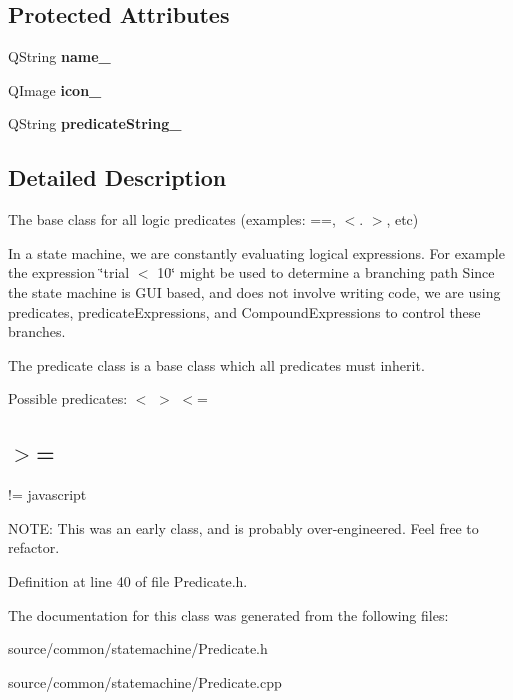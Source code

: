 \subsection*{Protected Attributes}
\begin{DoxyCompactItemize}
\item 
\hypertarget{class_picto_1_1_predicate_aa887b9849f3905bd94d6994c50ffce99}{Q\-String {\bfseries name\-\_\-}}\label{class_picto_1_1_predicate_aa887b9849f3905bd94d6994c50ffce99}

\item 
\hypertarget{class_picto_1_1_predicate_a6e10f1c005e76b496b3e9f4434eee4ea}{Q\-Image {\bfseries icon\-\_\-}}\label{class_picto_1_1_predicate_a6e10f1c005e76b496b3e9f4434eee4ea}

\item 
\hypertarget{class_picto_1_1_predicate_a5d896af45f950a33822433b823b53387}{Q\-String {\bfseries predicate\-String\-\_\-}}\label{class_picto_1_1_predicate_a5d896af45f950a33822433b823b53387}

\end{DoxyCompactItemize}


\subsection{Detailed Description}
The base class for all logic predicates (examples\-: ==, $<$. $>$, etc) 

In a state machine, we are constantly evaluating logical expressions. For example the expression \char`\"{}trial $<$ 10\char`\"{} might be used to determine a branching path Since the state machine is G\-U\-I based, and does not involve writing code, we are using predicates, predicate\-Expressions, and Compound\-Expressions to control these branches.

The predicate class is a base class which all predicates must inherit.

Possible predicates\-: $<$ $>$ $<$= \subsection*{$>$= }

!= javascript

N\-O\-T\-E\-: This was an early class, and is probably over-\/engineered. Feel free to refactor. 

Definition at line 40 of file Predicate.\-h.



The documentation for this class was generated from the following files\-:\begin{DoxyCompactItemize}
\item 
source/common/statemachine/Predicate.\-h\item 
source/common/statemachine/Predicate.\-cpp\end{DoxyCompactItemize}
